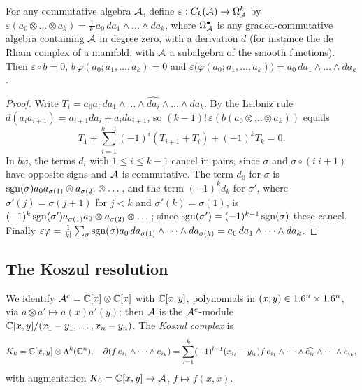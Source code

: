 \begin{lemma}\label{hochschild:lem:HKR-chain}
For any commutative algebra $\mathcal{A}$, define
$\varepsilon:C_k(\mathcal{A})\to\Omega^k_{\mathcal{A}}$ by $\varepsilon(a_0\otimes\dots\otimes
a_k)=\frac1{k!}a_0\,da_1\wedge\dots\wedge da_k$, where $\Omega^\bullet_{\mathcal{A}}$
is any graded-commutative algebra containing $\mathcal{A}$ in degree zero, with a
derivation $d$ (for instance the de Rham complex of a manifold, with $\mathcal{A}$ a
subalgebra of the smooth functions). Then $\varepsilon\circ b=0$,
$b\,\varphi(a_0;a_1,\dots,a_k)=0$ and
$\varepsilon\bigl(\varphi(a_0;a_1,\dots,a_k)\bigr)=a_0\,da_1\wedge\dots\wedge da_k$.
\end{lemma}
\begin{proof}
Write $T_i=a_0a_i\,da_1\wedge\dots\wedge\widehat{da_i}\wedge\dots\wedge da_k$.
By the Leibniz rule $d(a_ia_{i+1})=a_{i+1}da_i+a_ida_{i+1}$, so
$(k-1)!\,\varepsilon(b(a_0\otimes\dots\otimes a_k))$ equals
\begin{equation*}
  T_1+\sum_{i=1}^{k-1}(-1)^i(T_{i+1}+T_i)+(-1)^kT_k=0 .
\end{equation*}
In $b\varphi$, the terms $d_i$ with $1\le i\le k-1$ cancel in pairs, since
$\sigma$ and $\sigma\circ(i\ i{+}1)$ have opposite signs and $\mathcal{A}$ is
commutative. The term $d_0$ for $\sigma$ is $\operatorname{sgn}(\sigma)a_0a_{\sigma(1)}\otimes
a_{\sigma(2)}\otimes\dots$, and the term $(-1)^kd_k$ for $\sigma'$, where
$\sigma'(j)=\sigma(j+1)$ for $j<k$ and $\sigma'(k)=\sigma(1)$, is
$(-1)^k\operatorname{sgn}(\sigma')a_{\sigma(1)}a_0\otimes a_{\sigma(2)}\otimes\dots$; since
$\operatorname{sgn}(\sigma')=(-1)^{k-1}\operatorname{sgn}(\sigma)$ these cancel. Finally
$\varepsilon\varphi=\frac1{k!}\sum_\sigma\operatorname{sgn}(\sigma)a_0\,da_{\sigma(1)}\wedge\dots\wedge
da_{\sigma(k)}=a_0\,da_1\wedge\dots\wedge da_k$.
\end{proof}

\subsection{The Koszul resolution}
We identify $\mathcal{A}^e=\mathbb{C}[x]\otimes\mathbb{C}[x]$ with $\mathbb{C}[x,y]$, polynomials in
$(x,y)\in1.6^n\times1.6^n$, via $a\otimes a'\mapsto a(x)a'(y)$; then $\mathcal{A}$ is the
$\mathcal{A}^e$-module $\mathbb{C}[x,y]/(x_1-y_1,\dots,x_n-y_n)$. The \emph{Koszul complex} is
\begin{equation*}
  K_k=\mathbb{C}[x,y]\otimes\Lambda^k(\mathbb{C}^n),\quad
  \partial(f\,e_{i_1}\wedge\dots\wedge e_{i_k})=\sum_{l=1}^k(-1)^{l-1}
  (x_{i_l}-y_{i_l})f\,e_{i_1}\wedge\dots\wedge\widehat{e_{i_l}}\wedge\dots\wedge e_{i_k},
\end{equation*}
with augmentation $K_0=\mathbb{C}[x,y]\to\mathcal{A}$, $f\mapsto f(x,x)$.

